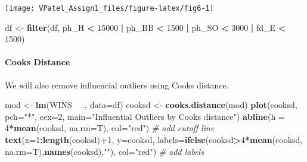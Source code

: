 \documentclass[]{article}
\newenvironment{Shaded}{\begin{snugshade}}{\end{snugshade}}
\newcommand{\CommentTok}[1]{\textcolor[rgb]{0.56,0.35,0.01}{\textit{#1}}}
\newcommand{\DataTypeTok}[1]{\textcolor[rgb]{0.13,0.29,0.53}{#1}}
\newcommand{\DecValTok}[1]{\textcolor[rgb]{0.00,0.00,0.81}{#1}}
\newcommand{\KeywordTok}[1]{\textcolor[rgb]{0.13,0.29,0.53}{\textbf{#1}}}
\newcommand{\NormalTok}[1]{#1}
\newcommand{\OperatorTok}[1]{\textcolor[rgb]{0.81,0.36,0.00}{\textbf{#1}}}
\newcommand{\StringTok}[1]{\textcolor[rgb]{0.31,0.60,0.02}{#1}}
\let\oldparagraph\paragraph
\renewcommand{\paragraph}[1]{\oldparagraph{#1}\mbox{}}
\begin{document}
\begin{center}\texttt{[image: VPatel\_Assign1\_files/figure-latex/fig6-1]} \end{center}

\begin{Shaded}
\begin{Highlighting}[]
\NormalTok{df <-}\StringTok{ }\KeywordTok{filter}\NormalTok{(df, ph_H }\OperatorTok{<}\StringTok{ }\DecValTok{15000} \OperatorTok{|}\StringTok{ }\NormalTok{ph_BB }\OperatorTok{<}\StringTok{ }\DecValTok{1500} \OperatorTok{|}\StringTok{ }\NormalTok{ph_SO }\OperatorTok{<}\StringTok{ }\DecValTok{3000} \OperatorTok{|}\StringTok{ }\NormalTok{fd_E }\OperatorTok{<}\StringTok{ }\DecValTok{1500}\NormalTok{)}
\end{Highlighting}
\end{Shaded}

\hypertarget{cooks-distance}{%
\paragraph{Cooks Distance}\label{cooks-distance}}

We will also remove influencial outliers using Cooks distance.

\begin{Shaded}
\begin{Highlighting}[]
\NormalTok{mod <-}\StringTok{ }\KeywordTok{lm}\NormalTok{(WINS }\OperatorTok{~}\StringTok{ }\NormalTok{., }\DataTypeTok{data=}\NormalTok{df)}
\NormalTok{cooksd <-}\StringTok{ }\KeywordTok{cooks.distance}\NormalTok{(mod)}
\KeywordTok{plot}\NormalTok{(cooksd, }\DataTypeTok{pch=}\StringTok{"*"}\NormalTok{, }\DataTypeTok{cex=}\DecValTok{2}\NormalTok{, }\DataTypeTok{main=}\StringTok{"Influential Outliers by Cooks distance"}\NormalTok{)}
\KeywordTok{abline}\NormalTok{(}\DataTypeTok{h =} \DecValTok{4}\OperatorTok{*}\KeywordTok{mean}\NormalTok{(cooksd, }\DataTypeTok{na.rm=}\NormalTok{T), }\DataTypeTok{col=}\StringTok{"red"}\NormalTok{)  }\CommentTok{# add cutoff line}
\KeywordTok{text}\NormalTok{(}\DataTypeTok{x=}\DecValTok{1}\OperatorTok{:}\KeywordTok{length}\NormalTok{(cooksd)}\OperatorTok{+}\DecValTok{1}\NormalTok{, }\DataTypeTok{y=}\NormalTok{cooksd, }\DataTypeTok{labels=}\KeywordTok{ifelse}\NormalTok{(cooksd}\OperatorTok{>}\DecValTok{4}\OperatorTok{*}\KeywordTok{mean}\NormalTok{(cooksd, }\DataTypeTok{na.rm=}\NormalTok{T),}\KeywordTok{names}\NormalTok{(cooksd),}\StringTok{""}\NormalTok{), }\DataTypeTok{col=}\StringTok{"red"}\NormalTok{)  }\CommentTok{# add labels}
\end{Highlighting}
\end{Shaded}
\end{document}
